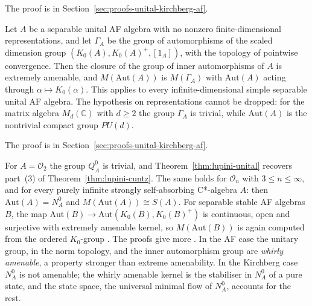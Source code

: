 The proof is in Section~\ref{sec:proofs-unital-kirchberg-af}.

\begin{theorem}\label{thm:lupini-af}
Let $A$ be a separable unital AF algebra with no nonzero finite-dimensional
representations, and let $\Gamma_A$ be the group of automorphisms of the
scaled dimension group $(K_0(A),K_0(A)^+,[1_A])$, with the topology of
pointwise convergence. Then the closure of the group of inner automorphisms of
$A$ is extremely amenable, and $M(\mathrm{Aut}(A))$ is $M(\Gamma_A)$ with
$\mathrm{Aut}(A)$ acting through $\alpha\mapsto K_0(\alpha)$. This applies to
every infinite-dimensional simple separable unital AF algebra. The hypothesis
on representations cannot be dropped: for the matrix algebra $M_d(\mathbb{C})$
with $d\geq2$ the group $\Gamma_A$ is trivial, while $\mathrm{Aut}(A)$ is the
nontrivial compact group $PU(d)$.
\end{theorem}

The proof is in Section~\ref{sec:proofs-unital-kirchberg-af}.

\begin{remark}\label{rem:lupini-unital}
For $A=\mathcal{O}_2$ the group $Q^0_A$ is trivial, and
Theorem~\ref{thm:lupini-unital} recovers part~(3) of
Theorem~\ref{thm:lupini-cuntz}. The same holds for $\mathcal{O}_n$ with
$3\leq n\leq\infty$, and for every purely infinite strongly self-absorbing
C*-algebra $A$: then $\mathrm{Aut}(A)=N^0_A$ and
$M(\mathrm{Aut}(A))\cong S(A)$. For separable stable AF algebras $B$, the map
$\mathrm{Aut}(B)\to\mathrm{Aut}(K_0(B),K_0(B)^+)$ is continuous, open and
surjective with extremely amenable kernel, so $M(\mathrm{Aut}(B))$ is again
computed from the ordered $K_0$-group \cite{LupiniStable2026}. The proofs give more
\cite{LupiniUnital2026}. In the AF case the unitary group, in the norm
topology, and the inner automorphism group are \emph{whirly amenable}, a
property stronger than extreme amenability. In the Kirchberg case $N^0_A$ is
not amenable; the whirly amenable kernel is the stabiliser in $N^0_A$ of a
pure state, and the state space, the universal minimal flow of $N^0_A$,
accounts for the rest.
\end{remark}
